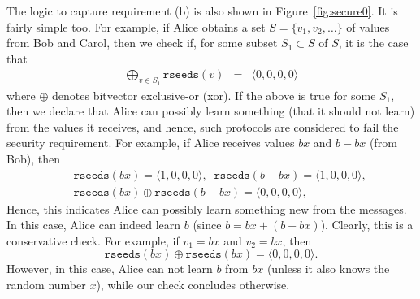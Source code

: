 \documentclass[preprint]{sig-alternate-05-2015}
\begin{document}
The logic to capture requirement (b)  is also shown in
Figure~\ref{fig:secure0}. It is fairly simple too. 
For example, if Alice obtains a set $S = \{v_1, v_2, \ldots\}$ of values
from Bob and Carol, then we check if, for some subset $S_1\subset S$ of $S$,
it is the case that
\begin{eqnarray*}
  \bigoplus_{v \in S_1}  \mathtt{rseeds}(v) & = & \langle 0,0,0,0\rangle
\end{eqnarray*}
where $\oplus$ denotes bitvector exclusive-or (xor).
If the above is true for some $S_1$, then we declare that Alice can
possibly learn something (that it should not learn) from the values it receives,
and hence, such protocols are considered to fail the security requirement.
For example,
if Alice receives values $bx$ and $b-bx$ (from Bob), then
\begin{eqnarray*}
  &&\mathtt{rseeds}(bx) = \langle 1,0,0,0\rangle,
\;\; 
\mathtt{rseeds}(b-bx) = \langle 1,0,0,0\rangle,
\\ &&
\mathtt{rseeds}(bx) \oplus \mathtt{rseeds}(b-bx) = \langle 0,0,0,0\rangle,
\end{eqnarray*}
Hence, this indicates Alice can possibly learn something new from the messages.
In this case, Alice can indeed learn $b$ (since $b = bx + (b-bx)$).
Clearly, this is a conservative check. For example,
if $v_1 = bx$ and $v_2 = bx$, then 
$$
\mathtt{rseeds}(bx) \oplus \mathtt{rseeds}(bx) = \langle 0,0,0,0\rangle.
$$
However, in this case, Alice can not learn $b$ from $bx$ (unless 
it also knows the random number $x$), while our check concludes otherwise.
\end{document}
